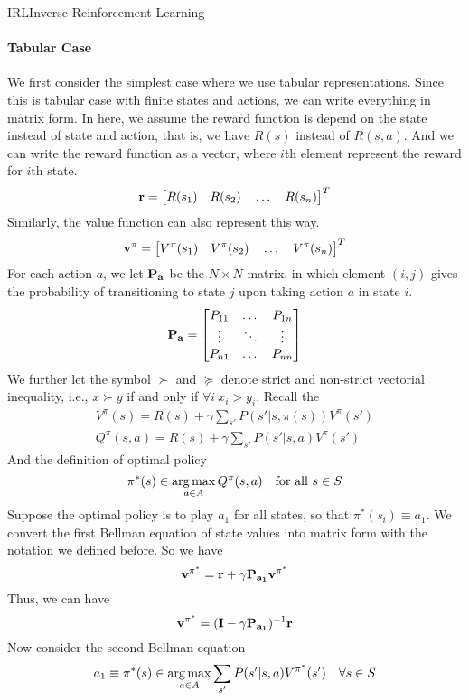 \documentclass[9pt]{article}
\begin{document}
\begin{topic}{IRL}{Inverse Reinforcement Learning}
\paragraph{Tabular Case} We first consider the simplest case where we use tabular representations. Since this is tabular case with finite states and actions, we can write everything in matrix form. In here, we assume the reward function is depend on the state instead of state and action, that is, we have $R(s)$ instead of $R(s,a)$. And we can write the reward function as a vector, where $i$th element represent the reward for $i$th state.
\[
	\mathbf{r} = \big[R(s_1) \quad R(s_2) \quad \dots \quad R(s_n)\big]^{T}
\]
Similarly, the value function can also represent this way.
\[
	\mathbf{v^\pi} =  \big[V^{\pi}(s_1) \quad V^{\pi}(s_2) \quad \dots \quad V^{\pi}(s_n)\big]^{T}
\]
For each action $a$, we let $\mathbf{P_a}$ be the $N\times N$ matrix, in which element $(i,j)$ gives the probability of transitioning to state $j$ upon taking action $a$ in state $i$.
\[
\mathbf{P_a} = \begin{bmatrix} 
    P_{11} & \dots & P_{1n}\\
    \vdots & \ddots & \vdots\\
    P_{n1} &\dots   & P_{nn} 
    \end{bmatrix}
\]
We further let the symbol $\succ$ and $\succeq$ denote strict and non-strict vectorial inequality, i.e., $x\succ y$ if and only if $\forall i \  x_i > y_i$. Recall the 
\[
\begin{split}
V^{\pi}(s) = R(s) + \gamma \sum_{s'}P(s'|s,\pi(s))V^{\pi}(s')\\
Q^{\pi}(s,a) = R(s) + \gamma \sum_{s'}P(s'|s,a)V^{\pi}(s')
\end{split}
\]
And the definition of optimal policy
\[
	\pi^*(s) \in \operatorname*{arg\,max}_{a\in A}Q^{\pi}(s,a) \quad \text{for all } s \in S
\]
Suppose the optimal policy is to play $a_1$ for all states, so that $\pi^*(s_i)\equiv a_1$. We convert the first Bellman equation of state values into matrix form with the notation we defined before. So we have 
\[
\mathbf{v^{\pi^*}} = \mathbf{r} + \gamma\mathbf{P_{a_1}}\mathbf{v^{\pi^*}}
\]
Thus, we can have 
\[
\mathbf{v^{\pi^*}} = (\mathbf{I} - \gamma\mathbf{P_{a_1}})^{-1} \mathbf{r}
\]
Now consider the second Bellman equation
\begin{equation}
\label{eq:irlt}
\begin{split}
& a_1 \equiv \pi^*(s) \in \argmax_{a\in A} \sum_{s'} P(s'|s,a) V^{\pi^*}(s') \quad \forall s \in S\\

\end{split}
\end{equation}
\end{topic}
\end{document}

